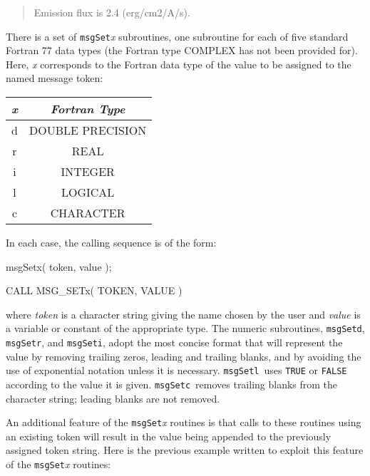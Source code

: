 \documentclass[twoside,11pt]{starlink}
\providecommand{\func}[1]{\texttt{#1}}
\providecommand{\farg}[1]{\textit{#1}}
\providecommand{\msgsetr}{\func{msgSetr}}
\providecommand{\msgsetd}{\func{msgSetd}}
\providecommand{\msgseti}{\func{msgSeti}}
\providecommand{\msgsetl}{\func{msgSetl}}
\providecommand{\msgsetc}{\func{msgSetc}}
\begin{document}
\begin {quote}
\begin {small}
\begin{terminalv}
Emission flux is 2.4 (erg/cm2/A/s).
\end{terminalv}
\end {small}
\end {quote}

There is a set of \func{msgSet}\textit{x} subroutines, one subroutine for each of five
standard Fortran 77 data types (the Fortran type COMPLEX has not been provided
for).
Here, \textit{x} corresponds to the Fortran data type of the value to be assigned
to the named message token:

\begin {center}
\begin {tabular}{||c|c||}
\hline
\textit{x} & \textit{Fortran Type}\\
\hline
d & DOUBLE PRECISION\\
r & REAL\\
i & INTEGER\\
l & LOGICAL\\
c & CHARACTER\\
\hline
\end {tabular}
\end {center}

In each case, the calling sequence is of the form:

\begin {small}
\begin{terminalv}
msgSetx( token, value );

CALL MSG_SETx( TOKEN, VALUE )
\end{terminalv}
\end {small}

where \farg{token} is a character string giving the name chosen by the user and \farg{value}
is a variable or constant of the appropriate type.
The numeric subroutines, \msgsetd, \msgsetr, and \msgseti, adopt the most
concise format that will represent the value by removing trailing zeros,
leading and trailing blanks, and by avoiding the use of exponential notation
unless it is necessary.
\msgsetl\ uses \texttt{TRUE} or \texttt{FALSE} according to the value it is
given. \msgsetc\ removes trailing blanks from the character string; leading
blanks are not removed.

An additional feature of the \func{msgSet}\textit{x} routines is that calls to these
routines using an existing token will result in the value being appended
to the previously assigned token string.
Here is the previous example written to exploit this feature of the
\func{msgSet}\textit{x} routines:
\end{document}
